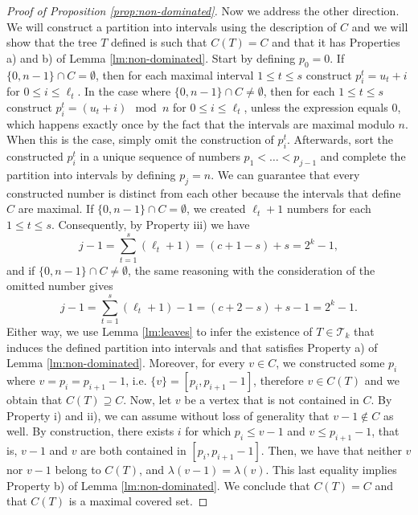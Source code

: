 \documentclass[11pt]{article}
\newcommand{\BSTs}{\mathcal{T}}
\newcommand\+{\mkern2mu}
\begin{document}
\begin{proof}[Proof of Proposition \ref{prop:non-dominated}]
    Now we address the other direction. We will construct a partition into intervals using the description of $C$ and we will show that the tree $T$ defined is such that $C(T) = C$ and that it has Properties a) and b) of Lemma \ref{lm:non-dominated}. Start by defining $p_0 = 0$. If $\{0, n-1\} \cap C = \emptyset$, then for each maximal interval $1 \leq t \leq s$ construct $p_i^t = u_t + i$ for $0 \leq i \leq \ell_t$. In the case where $\{0, n-1\} \cap C \neq \emptyset$, then for each $1 \leq t \leq s$ construct $p_i^t = (u_t + i) \mod{n}$ for $0 \leq i \leq \ell_t$, unless the expression equals 0, which happens exactly once by the fact that the intervals are maximal modulo $n$. When this is the case, simply omit the construction of $p_i^t$. Afterwards, sort the constructed $p_i^t$ in a unique sequence of numbers $p_1 < \ldots < p_{j-1}$ and complete the partition into intervals by defining $p_j = n$. We can guarantee that every constructed number is distinct from each other because the intervals that define $C$ are maximal. If $\{0, n-1\} \cap C = \emptyset$, we created $\ell_t + 1$ numbers for each $1 \leq t \leq s$. Consequently, by Property iii) we have
    \begin{equation*}
        j-1 = \sum_{t=1}^s (\ell_t + 1) = (c + 1 - s) + s = 2^k - 1, 
    \end{equation*}
    and if $\{0, n-1\} \cap C \neq \emptyset$, the same reasoning with the consideration of the omitted number gives
    \begin{equation}
        j-1 = \sum_{t=1}^s (\ell_t + 1) - 1 = (c + 2 - s) + s - 1 = 2^k - 1. 
    \end{equation}
    Either way, we use Lemma \ref{lm:leaves} to infer the existence of $T \in \BSTs_k$ that induces the defined partition into intervals and that satisfies Property a) of Lemma \ref{lm:non-dominated}. Moreover, for every $v \in C$, we constructed some $p_i$ where $v = p_i = p_{i+1} - 1$, i.e. $\{v\} = [p_i, p_{i+1}-1]$, therefore $v \in C(T)$ and we obtain that $C(T) \supseteq C$. Now, let $v$ be a vertex that is not contained in $C$. By Property i) and ii), we can assume without loss of generality that $v-1 \not \in C$ as well. By construction, there exists $i$ for which $p_i \leq v-1$ and $v \leq p_{i+1}-1$, that is, $v-1$ and $v$ are both contained in $[p_i, p_{i+1}-1]$. Then, we have that neither $v$ nor $v-1$ belong to $C(T)$, and $\lambda(v-1) = \lambda(v)$. This last equality implies Property b) of Lemma \ref{lm:non-dominated}. We conclude that $C(T)= C$ and that $C(T)$ is a maximal covered set.
    \end{proof}
\end{document}
